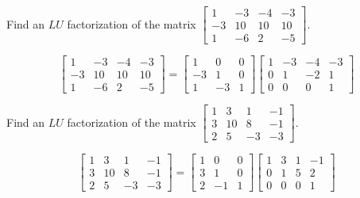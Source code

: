 \documentclass{ximera}
\begin{document}
\begin{problem}\label{prb:4.65} Find an $LU$ factorization of the matrix $ 
\left[
\begin{array}{rrrr}
1 & -3 & -4 & -3 \\
-3 & 10 & 10 & 10 \\
1 & -6 & 2 & -5
\end{array}
 \right] .$
\begin{hint}
\[
 \left[
\begin{array}{rrrr}
1 & -3 & -4 & -3 \\
-3 & 10 & 10 & 10 \\
1 & -6 & 2 & -5
\end{array} \right] = \left[
\begin{array}{rrr}
1 & 0 & 0 \\
-3 & 1 & 0 \\
1 & -3 & 1
\end{array}
\right] \left[
\begin{array}{rrrr}
1 & -3 & -4 & -3 \\
0 & 1 & -2 & 1 \\
0 & 0 & 0 & 1
\end{array}
\right]
\]
\end{hint}
\end{problem}


\begin{problem}\label{prb:4.66} Find an $LU$ factorization of the matrix
$\left[
\begin{array}{rrrr}
1 & 3 & 1 & -1 \\
3 & 10 & 8 & -1 \\
2 & 5 & -3 & -3
\end{array}
 \right] .$
\begin{hint}
\[
\left[
\begin{array}{rrrr}
1 & 3 & 1 & -1 \\
3 & 10 & 8 & -1 \\
2 & 5 & -3 & -3
\end{array}
 \right] = \left[
\begin{array}{rrr}
1 & 0 & 0 \\
3 & 1 & 0 \\
2 & -1 & 1
\end{array}
\right] \left[
\begin{array}{rrrr}
1 & 3 & 1 & -1 \\
0 & 1 & 5 & 2 \\
0 & 0 & 0 & 1
\end{array}
\right]
\]
\end{hint}
\end{problem}
\end{document}
